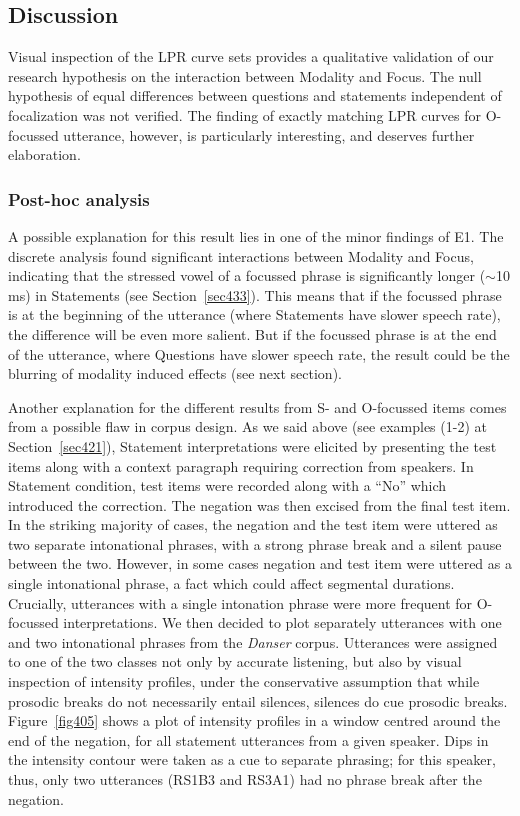 \subsection{Discussion}\label{sec444}
Visual inspection of the LPR curve sets provides a qualitative validation of our research hypothesis on the interaction between Modality and Focus. The null hypothesis of equal differences between questions and statements independent of focalization was not verified. The finding of exactly matching LPR curves for O-focussed utterance, however, is particularly interesting, and deserves further elaboration.

\subsubsection{Post-hoc analysis}\label{sec4441}
A possible explanation for this result lies in one of the minor findings of E1. The discrete analysis found significant interactions between Modality and Focus, indicating that the stressed vowel of a focussed phrase is significantly longer ($ \sim $10 ms) in Statements (see Section~\ref{sec433}). This means that if the focussed phrase is at the beginning of the utterance (where Statements have slower speech rate), the difference will be even more salient. But if the focussed phrase is at the end of the utterance, where Questions have slower speech rate, the result could be the blurring of modality induced effects (see next section).

Another explanation for the different results from S- and O-focussed items comes from a possible flaw in corpus design. As we said above (see examples (1-2) at Section~\ref{sec421}), Statement interpretations were elicited by presenting the test items along with a context paragraph requiring correction from speakers. In Statement condition, test items were recorded along with a ``No'' which introduced the correction. The negation was then excised from the final test item. In the striking majority of cases, the negation and the test item were uttered as two separate intonational phrases, with a strong phrase break and a silent pause between the two. However, in some cases negation and test item were uttered as a single intonational phrase, a fact which could affect segmental durations. Crucially, utterances with a single intonation phrase were more frequent for O-focussed interpretations. We then decided to plot separately utterances with one and two intonational phrases from the \textit{Danser} corpus. Utterances were assigned to one of the two classes not only by accurate listening, but also by visual inspection of intensity profiles, under the conservative assumption that while prosodic breaks do not necessarily entail silences, silences do cue prosodic breaks. Figure~\ref{fig405} shows a plot of intensity profiles in a window centred around the end of the negation, for all statement utterances from a given speaker. Dips in the intensity contour were taken as a cue to separate phrasing; for this speaker, thus, only two utterances (RS1B3 and RS3A1) had no phrase break after the negation.

